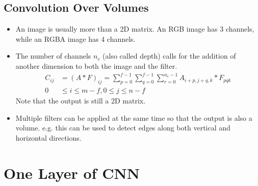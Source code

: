 \subsection{Convolution Over Volumes}
\begin{itemize}
  \item An image is usually more than a 2D matrix. An RGB image has 3 channels, while an RGBA image has 4 channels. 
  \item The number of channels $n_c$ (also called depth) calls for the addition of another dimension to both the image and the filter.
  \begin{align*}
    C_{ij}&=\left(A*F\right)_{ij}=\displaystyle\sum_{p=0}^{f-1}\displaystyle\sum_{q=0}^{f-1}\displaystyle\sum_{r=0}^{n_c-1}A_{i+p,j+q,k}*F_{pqk}\\
    0&\le i\le m-f, 0\le j\le n-f
  \end{align*}
  Note that the output is still a 2D matrix.
  \item Multiple filters can be applied at the same time so that the output is also a volume. e.g. this can be used to detect edges along both vertical and horizontal directions.
\end{itemize}
\section{One Layer of CNN}
\ifx\PREAMBLE\undefined

\fi